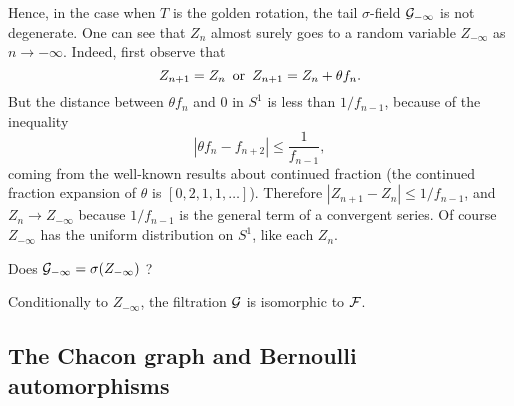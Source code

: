 \documentclass[12pt,a4paper]{article}
\begin{document}
Hence, in the case when $T$ is the golden rotation, the tail $\sigma$-field 
$\mathcal{G}_{-\infty}$ is not degenerate. 
One can see that $Z_n$ almost surely goes to a random variable $Z_{-\infty}$ 
as $n \to -\infty$.  
Indeed, first observe that
$$
Z_{n+1} = Z_n \, \text{ or\, $Z_{n+1} = Z_n + \theta f_n$}. 
$$
But the distance between $\theta f_n$ and $0$ in $S^1$ is less than 
$1/f_{n-1}$, because of the inequality
$$
|\theta f_n - f_{n+2}| \leq \frac{1}{f_{n-1}},
$$
coming from the well-known results about continued fraction 
(the continued fraction expansion of $\theta$ is $[0, 2, 1, 1, \ldots]$). 
Therefore $|Z_{n+1} - Z_n| \leq 1/f_{n-1}$, and $Z_n \to Z_{-\infty}$ because 
$1/f_{n-1}$ is the general term of a convergent series. 
Of course $Z_{-\infty}$ has the uniform distribution on $S^1$, like each $Z_n$.

\begin{question}
Does $\mathcal{G}_{-\infty} = \sigma(Z_{-\infty})$ ? 
\end{question}

\begin{clarify}
Conditionally to $Z_{-\infty}$, the filtration $\mathcal{G}$ is isomorphic to $\mathcal{F}$.  
\end{clarify}



\subsection{The Chacon graph and Bernoulli automorphisms}
\end{document}
